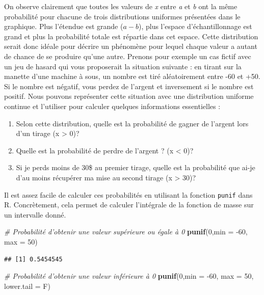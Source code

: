\documentclass[
  11pt,
  french,
]{book}
\makeatletter
\newenvironment{Shaded}{\begin{snugshade}}{\end{snugshade}}
\newcommand{\CommentTok}[1]{\textcolor[rgb]{0.56,0.35,0.01}{\textit{#1}}}
\newcommand{\DataTypeTok}[1]{\textcolor[rgb]{0.13,0.29,0.53}{#1}}
\newcommand{\DecValTok}[1]{\textcolor[rgb]{0.00,0.00,0.81}{#1}}
\newcommand{\KeywordTok}[1]{\textcolor[rgb]{0.13,0.29,0.53}{\textbf{#1}}}
\newcommand{\NormalTok}[1]{#1}
\providecommand{\tightlist}{%
  \setlength{\itemsep}{0pt}\setlength{\parskip}{0pt}}
\newenvironment{kframe}{%
\medskip{}
\setlength{\fboxsep}{.8em}
 \def\at@end@of@kframe{}%
 \ifinner\ifhmode%
  \def\at@end@of@kframe{\end{minipage}}%
  \begin{minipage}{\columnwidth}%
 \fi\fi%
 \def\FrameCommand##1{\hskip\@totalleftmargin \hskip-\fboxsep
 \colorbox{shadecolor}{##1}\hskip-\fboxsep
     \hskip-\linewidth \hskip-\@totalleftmargin \hskip\columnwidth}%
 \MakeFramed {\advance\hsize-\width
   \@totalleftmargin\z@ \linewidth\hsize
   \@setminipage}}%
 {\par\unskip\endMakeFramed%
 \at@end@of@kframe}
\renewenvironment{Shaded}{\begin{kframe}}{\end{kframe}}
\makeatother
\begin{document}
On observe clairement que toutes les valeurs de \emph{x} entre \emph{a} et \emph{b} ont la même probabilité pour chacune de trois distributions uniformes présentées dans le graphique. Plus l'étendue est grande (\(a-b\)), plus l'espace d'échantillonnage est grand et plus la probabilité totale est répartie dans cet espace. Cette distribution serait donc idéale pour décrire un phénomène pour lequel chaque valeur a autant de chance de se produire qu'une autre. Prenons pour exemple un cas fictif avec un jeu de hasard qui vous proposerait la situation suivante : en tirant sur la manette d'une machine à sous, un nombre est tiré aléatoirement entre -60 et +50. Si le nombre est négatif, vous perdez de l'argent et inversement si le nombre est positif. Nous pouvons représenter cette situation avec une distribution uniforme continue et l'utiliser pour calculer quelques informations essentielles :

\begin{enumerate}
\def\labelenumi{\arabic{enumi}.}
\tightlist
\item
  Selon cette distribution, quelle est la probabilité de gagner de l'argent lors d'un tirage (x \textgreater{} 0)?
\item
  Quelle est la probabilité de perdre de l'argent ? (x \textless{} 0)?
\item
  Si je perds moins de 30\$ au premier tirage, quelle est la probabilité que ai-je d'au moins récupérer ma mise au second tirage (x \textgreater{} 30)?
\end{enumerate}

Il est assez facile de calculer ces probabilités en utilisant la fonction \texttt{punif} dans R. Concrètement, cela permet de calculer l'intégrale de la fonction de masse sur un intervalle donné.

\begin{Shaded}
\begin{Highlighting}[]
\CommentTok{# Probabilité d'obtenir une valeur supérieure ou égale à 0}
\KeywordTok{punif}\NormalTok{(}\DecValTok{0}\NormalTok{,}\DataTypeTok{min =} \DecValTok{-60}\NormalTok{, }\DataTypeTok{max =} \DecValTok{50}\NormalTok{)}
\end{Highlighting}
\end{Shaded}

\begin{verbatim}
## [1] 0.5454545
\end{verbatim}

\begin{Shaded}
\begin{Highlighting}[]
\CommentTok{# Probabilité d'obtenir une valeur inférieure à 0}
\KeywordTok{punif}\NormalTok{(}\DecValTok{0}\NormalTok{,}\DataTypeTok{min =} \DecValTok{-60}\NormalTok{, }\DataTypeTok{max =} \DecValTok{50}\NormalTok{, }\DataTypeTok{lower.tail =}\NormalTok{ F)}
\end{Highlighting}
\end{Shaded}
\end{document}

